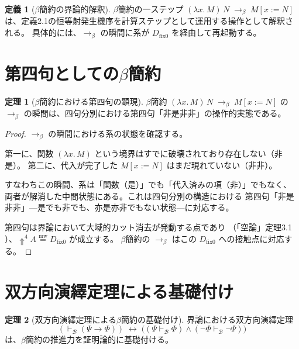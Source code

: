 \documentclass[11pt,a4paper]{ltjsarticle}
\newcommand{\mweq}{\mathrel{\overset{\mathrm{mw}}{=}}}
\newcommand{\dfix}{D_{\mathrm{fix}0}}
\newcommand{\metanegation}{\Uparrow}
\newcommand{\Bval}{\mathcal{B}}
\theoremstyle{definition}
\newtheorem{definition}{定義}[section]
\newtheorem{theorem}{定理}[section]
\begin{document}
\begin{definition}[$\beta$簡約の界論的解釈]
$\beta$簡約の一ステップ
$(\lambda x.\, M)\, N \;\to_\beta\; M[x := N]$
は、定義2.1の恒等射発生機序を計算ステップとして運用する操作として解釈される。
具体的には、$\to_\beta$ の瞬間に系が $\dfix$ を経由して再起動する。
\end{definition}

\section{第四句としての$\beta$簡約}

\begin{theorem}[$\beta$簡約における第四句の顕現]
$\beta$簡約 $(\lambda x.\, M)\, N \;\to_\beta\; M[x := N]$ の
$\to_\beta$ の瞬間は、四句分別における第四句「非是非非」の操作的実態である。
\end{theorem}

\begin{proof}
$\to_\beta$ の瞬間における系の状態を確認する。

第一に、関数 $(\lambda x.\, M)$ という境界はすでに破壊されており存在しない（非是）。
第二に、代入が完了した $M[x := N]$ はまだ現れていない（非非）。

すなわちこの瞬間、系は「関数（是）」でも「代入済みの項（非）」でもなく、
両者が解消した中間状態にある。これは四句分別の構造における
第四句「非是非非」---是でも非でも、亦是亦非でもない状態---に対応する。

第四句は界論において大域的カット消去が発動する点であり
（「空論」定理3.1 \cite{Chiba2026_sunyata} ）、$\metanegation^4 A \mweq \dfix$ が成立する。
$\beta$簡約の $\to_\beta$ はこの $\dfix$ への接触点に対応する。
\end{proof}

\section{双方向演繹定理による基礎付け}

\begin{theorem}[双方向演繹定理による$\beta$簡約の基礎付け]
界論における双方向演繹定理
\[
(\vdash_{\Bval}(\Psi \to \Phi))
\;\leftrightarrow\;
\bigl((\Psi \vdash_{\Bval} \Phi) \land (\neg\Phi \vdash_{\Bval} \neg\Psi)\bigr)
\]
は、$\beta$簡約の推進力を証明論的に基礎付ける。
\end{theorem}
\end{document}

